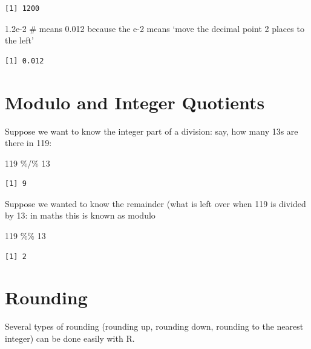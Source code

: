 \documentclass[
  letterpaper,
  DIV=11,
  numbers=noendperiod]{scrreprt}
\newenvironment{Shaded}{\begin{snugshade}}{\end{snugshade}}
\newcommand{\CommentTok}[1]{\textcolor[rgb]{0.37,0.37,0.37}{#1}}
\newcommand{\DecValTok}[1]{\textcolor[rgb]{0.68,0.00,0.00}{#1}}
\newcommand{\FloatTok}[1]{\textcolor[rgb]{0.68,0.00,0.00}{#1}}
\newcommand{\SpecialCharTok}[1]{\textcolor[rgb]{0.37,0.37,0.37}{#1}}
\begin{document}
\begin{verbatim}
[1] 1200
\end{verbatim}

\begin{Shaded}
\begin{Highlighting}[]
\FloatTok{1.2e{-}2} \CommentTok{\# means 0.012 because the e{-}2 means ‘move the decimal point 2 places to the left’}
\end{Highlighting}
\end{Shaded}

\begin{verbatim}
[1] 0.012
\end{verbatim}

\hypertarget{modulo-and-integer-quotients}{%
\section{Modulo and Integer
Quotients}\label{modulo-and-integer-quotients}}

Suppose we want to know the integer part of a division: say, how many
13s are there in 119:

\begin{Shaded}
\begin{Highlighting}[]
\DecValTok{119} \SpecialCharTok{\%/\%} \DecValTok{13}
\end{Highlighting}
\end{Shaded}

\begin{verbatim}
[1] 9
\end{verbatim}

Suppose we wanted to know the remainder (what is left over when 119 is
divided by 13: in maths this is known as modulo

\begin{Shaded}
\begin{Highlighting}[]
\DecValTok{119} \SpecialCharTok{\%\%} \DecValTok{13}
\end{Highlighting}
\end{Shaded}

\begin{verbatim}
[1] 2
\end{verbatim}

\hypertarget{rounding}{%
\section{Rounding}\label{rounding}}

Several types of rounding (rounding up, rounding down, rounding to the
nearest integer) can be done easily with R.
\end{document}
